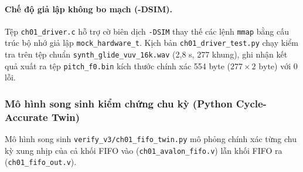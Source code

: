 \paragraph{Chế độ giả lập không bo mạch (-DSIM).}
Tệp \texttt{ch01\_driver.c} hỗ trợ cờ biên dịch \texttt{-DSIM} thay thế các lệnh \texttt{mmap} bằng cấu trúc bộ nhớ giả lập \texttt{mock\_hardware\_t}. Kịch bản \texttt{ch01\_driver\_test.py} chạy kiểm tra trên tệp chuẩn \texttt{synth\_glide\_vuv\_16k.wav} (2,8 s, 277 khung), ghi nhận kết quả xuất ra tệp \texttt{pitch\_f0.bin} kích thước chính xác 554 byte ($277 \times 2\text{ byte}$) với 0 lỗi.

\subsubsection*{Mô hình song sinh kiểm chứng chu kỳ (Python Cycle-Accurate Twin)}
Mô hình song sinh \texttt{verify\_v3/ch01\_fifo\_twin.py} mô phỏng chính xác từng chu kỳ xung nhịp của cả khối FIFO vào (\texttt{ch01\_avalon\_fifo.v}) lẫn khối FIFO ra (\texttt{ch01\_fifo\_out.v}).

